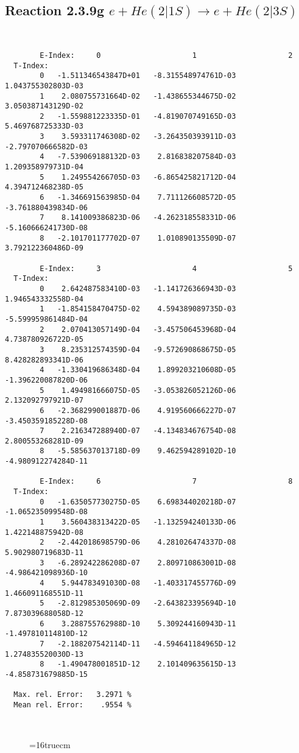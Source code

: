 \documentclass[12pt]{article}
\begin{document}
\subsection{
Reaction 2.3.9g $ e + He(2|1S) \rightarrow e + He(2|3S) $
}




\begin{small}\begin{verbatim}


        E-Index:     0                     1                     2
  T-Index:
        0   -1.511346543847D+01   -8.315548974761D-03    1.043755302803D-03
        1    2.080755731664D-02   -1.438655344675D-02    3.050387143129D-02
        2   -1.559881223335D-01   -4.819070749165D-03    5.469768725333D-03
        3    3.593311746308D-02   -3.264350393911D-03   -2.797070666582D-03
        4   -7.539069188132D-03    2.816838207584D-03    1.209358979731D-04
        5    1.249554266705D-03   -6.865425821712D-04    4.394712468238D-05
        6   -1.346691563985D-04    7.711126608572D-05   -3.761880439834D-06
        7    8.141009386823D-06   -4.262318558331D-06   -5.160666241730D-08
        8   -2.101701177702D-07    1.010890135509D-07    3.792122360486D-09

        E-Index:     3                     4                     5
  T-Index:
        0    2.642487583410D-03   -1.141726366943D-03    1.946543332558D-04
        1   -1.854158470475D-02    4.594389089735D-03   -5.599959861484D-04
        2    2.070413057149D-04   -3.457506453968D-04    4.738780926722D-05
        3    8.235312574359D-04   -9.572690868675D-05    8.428282893341D-06
        4   -1.330419686348D-04    1.899203210608D-05   -1.396220087820D-06
        5    1.494981666075D-05   -3.053826052126D-06    2.132092797921D-07
        6   -2.368299001887D-06    4.919560666227D-07   -3.450359185228D-08
        7    2.216347288940D-07   -4.134834676754D-08    2.800553268281D-09
        8   -5.585637013718D-09    9.462594289102D-10   -4.980912274284D-11

        E-Index:     6                     7                     8
  T-Index:
        0   -1.635057730275D-05    6.698344020218D-07   -1.065235099548D-08
        1    3.560438313422D-05   -1.132594240133D-06    1.422148875942D-08
        2   -2.442018698579D-06    4.281026474337D-08    5.902980719683D-11
        3   -6.289242286208D-07    2.809710863001D-08   -4.986421098936D-10
        4    5.944783491030D-08   -1.403317455776D-09    1.466091168551D-11
        5   -2.812985305069D-09   -2.643823395694D-10    7.873039688058D-12
        6    3.288755762988D-10    5.309244160943D-11   -1.497810114810D-12
        7   -2.188207542114D-11   -4.594641184965D-12    1.274835520030D-13
        8   -1.490478001851D-12    2.101409635615D-13   -4.858731679885D-15

  Max. rel. Error:   3.2971 %
  Mean rel. Error:    .9554 %



\end{verbatim}\end{small}
\begin{figure} \label{2.3.9g}
\epsfxsize=16truecm
\end{figure}
\newpage
\end{document}

